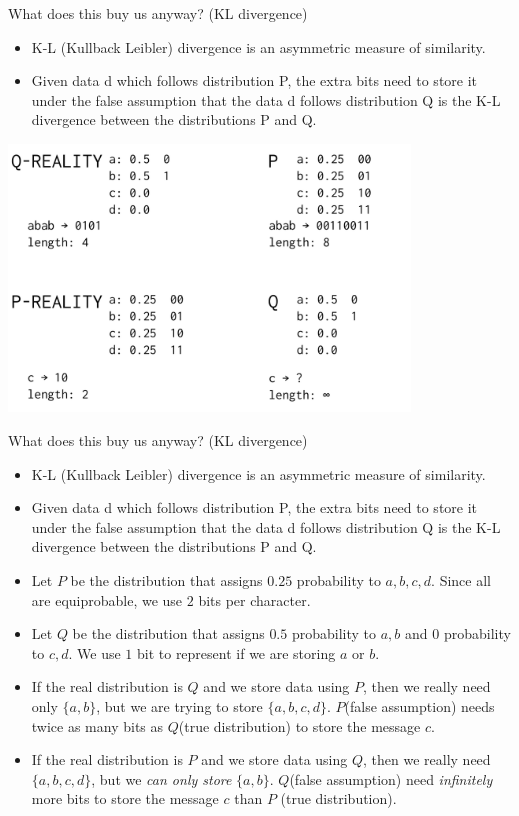 \documentclass[8pt]{beamer}
\begin{document}
\begin{frame}{What does this buy us anyway? (KL divergence)}
  \begin{itemize}
    \item K-L (Kullback Leibler) divergence is an asymmetric measure of similarity.
    \item Given data d which follows distribution P, the extra bits need to store
      it under the false assumption that the data d follows distribution Q is the K-L divergence
      between the distributions P and Q.
    \end{itemize}
  \includegraphics[width=0.8\textwidth]{./kl-divergence-asymmetry.pdf}
\end{frame}

\begin{frame}{What does this buy us anyway? (KL divergence)}
\begin{itemize}
 \item K-L (Kullback Leibler) divergence is an asymmetric measure of similarity.
 \item Given data d which follows distribution P, the extra bits need to store
    it under the false assumption that the data d follows distribution Q is the K-L divergence
    between the distributions P and Q.
\item Let $P$ be the distribution that assigns $0.25$ probability to $a, b, c, d$. Since all are equiprobable, we use $2$ bits per character.
\item Let $Q$ be the distribution that assigns $0.5$ probability to $a, b$ and $0$ probability to $c, d$. We use $1$ bit to represent if we are storing $a$ or $b$.
\item If the real distribution is $Q$ and we store data using $P$, then we really need only $\{a, b\}$, but we are trying to store $\{a, b, c, d\}$. $P$(false assumption) needs
  twice as many bits as $Q$(true distribution) to store the message $c$.
\item If the real distribution is $P$ and we store data using $Q$, then we really need $\{a, b, c, d\}$, but we \emph{can only store} $\{a, b\}$. $Q$(false assumption)
  need \emph{infinitely} more bits to store the message $c$ than $P$ (true distribution).
\end{itemize}
\end{frame}
\end{document}
